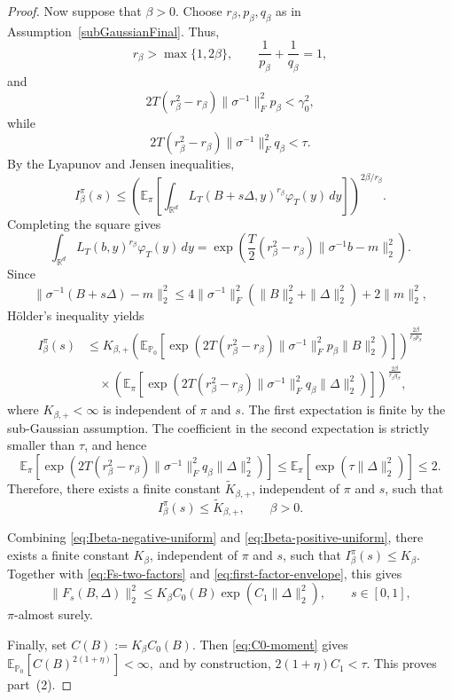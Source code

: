 \documentclass[11pt]{article}
\theoremstyle{definition}
\newcommand{\R}{\mathbb{R}}
\newcommand{\E}{\mathbb{E}}
\begin{document}
\begin{proof}
Now suppose that $\beta>0$. Choose
$r_\beta,p_\beta,q_\beta$ as in
Assumption~\ref{subGaussianFinal}. Thus,
\[
r_\beta>\max\{1,2\beta\},
\qquad
\frac{1}{p_\beta}+\frac{1}{q_\beta}=1,
\]
and
\[
2T(r_\beta^2-r_\beta)
\|\sigma^{-1}\|_F^2p_\beta
<
\gamma_0^2,
\]
while
\[
2T(r_\beta^2-r_\beta)
\|\sigma^{-1}\|_F^2q_\beta
<
\tau.
\]
By the Lyapunov and Jensen inequalities,
\[
I_\beta^\pi(s)
\leq
\left(
\E_\pi
\left[
\int_{\R^d}
L_T(B+s\Delta,y)^{r_\beta}
\varphi_T(y)\,dy
\right]
\right)^{2\beta/r_\beta}.
\]
Completing the square gives
\[
\int_{\R^d}
L_T(b,y)^{r_\beta}
\varphi_T(y)\,dy
=
\exp\!\left(
\frac{T}{2}
(r_\beta^2-r_\beta)
\|\sigma^{-1}b-m\|_2^2
\right).
\]
Since
\[
\|\sigma^{-1}(B+s\Delta)-m\|_2^2
\leq
4\|\sigma^{-1}\|_F^2
\left(
\|B\|_2^2+\|\Delta\|_2^2
\right)
+2\|m\|_2^2,
\]
{H\"older's inequality} yields
\begin{align*}
I_\beta^\pi(s)
&\leq
K_{\beta,+}
\left(
\E_{\mathbb P_0}
\left[
\exp\!\left(
2T(r_\beta^2-r_\beta)
\|\sigma^{-1}\|_F^2p_\beta
\|B\|_2^2
\right)
\right]
\right)^{\frac{2\beta}{r_\beta p_\beta}} \\
&\quad\times
\left(
\E_\pi
\left[
\exp\!\left(
2T(r_\beta^2-r_\beta)
\|\sigma^{-1}\|_F^2q_\beta
\|\Delta\|_2^2
\right)
\right]
\right)^{\frac{2\beta}{r_\beta q_\beta}},
\end{align*}
where $K_{\beta,+}<\infty$ is independent of $\pi$ and $s$.
The first expectation is finite by the sub-Gaussian assumption. The
coefficient in the second expectation is strictly smaller than $\tau$,
and hence
\[
\E_\pi
\left[
\exp\!\left(
2T(r_\beta^2-r_\beta)
\|\sigma^{-1}\|_F^2q_\beta
\|\Delta\|_2^2
\right)
\right]
\leq
\E_\pi
\left[
\exp\!\left(
\tau\|\Delta\|_2^2
\right)
\right]
\leq 2.
\]
Therefore, there exists a finite constant $\widetilde K_{\beta,+}$,
independent of $\pi$ and $s$, such that
\begin{equation}\label{eq:Ibeta-positive-uniform}
I_\beta^\pi(s)
\leq
\widetilde K_{\beta,+},
\qquad
\beta>0.
\end{equation}

Combining \eqref{eq:Ibeta-negative-uniform} and
\eqref{eq:Ibeta-positive-uniform}, there exists a finite constant
$K_\beta$, independent of $\pi$ and $s$, such that $I_\beta^\pi(s)\leq K_\beta.$
Together with \eqref{eq:Fs-two-factors} and
\eqref{eq:first-factor-envelope}, this gives
\[
\|F_s(B,\Delta)\|_2^2
\leq
K_\beta C_0(B)
\exp\!\left(
C_1\|\Delta\|_2^2
\right),
\qquad
s\in[0,1],
\]
$\pi$-almost surely.

Finally, set $C(B):=K_\beta C_0(B).$
Then \eqref{eq:C0-moment} gives $\E_{\mathbb P_0}
\left[
C(B)^{2(1+\eta)}
\right]
<\infty,$
and by construction, $2(1+\eta)C_1<\tau.$
This proves part~(2).
\end{proof}
\end{document}
